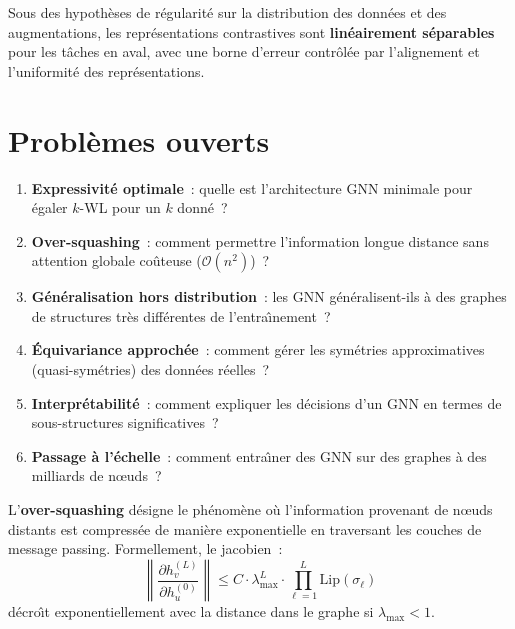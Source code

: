\begin{theoreme}
Sous des hypoth\`eses de r\'egularit\'e sur la distribution des
donn\'ees et des augmentations, les repr\'esentations contrastives
sont \textbf{lin\'eairement s\'eparables} pour les t\^aches en
aval, avec une borne d'erreur contr\^ol\'ee par l'alignement et
l'uniformit\'e des repr\'esentations.
\end{theoreme}

\section{Probl\`emes ouverts}
\label{sec:problemes_ouverts}

\begin{remarque}
\begin{enumerate}
  \item \textbf{Expressivit\'e optimale}~: quelle est l'architecture
        GNN minimale pour \'egaler $k$-WL pour un $k$ donn\'e~?
  \item \textbf{Over-squashing}~: comment permettre l'information
        longue distance sans attention globale co\^uteuse
        ($\mathcal{O}(n^2)$)~?
  \item \textbf{G\'en\'eralisation hors distribution}~: les GNN
        g\'en\'eralisent-ils \`a des graphes de structures tr\`es
        diff\'erentes de l'entra\^\i nement~?
  \item \textbf{\'Equivariance approch\'ee}~: comment g\'erer les
        sym\'etries approximatives (quasi-sym\'etries) des donn\'ees
        r\'eelles~?
  \item \textbf{Interpr\'etabilit\'e}~: comment expliquer les
        d\'ecisions d'un GNN en termes de sous-structures
        significatives~?
  \item \textbf{Passage \`a l'\'echelle}~: comment entra\^\i ner
        des GNN sur des graphes \`a des milliards de n\oe uds~?
\end{enumerate}
\end{remarque}

\begin{definition}
L'\textbf{over-squashing} d\'esigne le ph\'enom\`ene o\`u
l'information provenant de n\oe uds distants est compress\'ee
de mani\`ere exponentielle en traversant les couches de message
passing. Formellement, le jacobien~:
\[
  \left\|\frac{\partial h_v^{(L)}}{\partial h_u^{(0)}}\right\|
  \leq C \cdot \lambda_{\max}^L \cdot
  \prod_{\ell=1}^L \mathrm{Lip}(\sigma_\ell)
\]
d\'ecro\^\i t exponentiellement avec la distance dans le graphe
si $\lambda_{\max} < 1$.
\end{definition}

